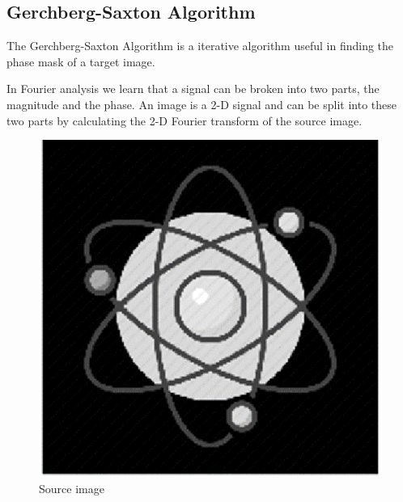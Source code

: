\documentclass{article}
\begin{document}
\pagebreak
\subsection{Gerchberg-Saxton Algorithm}
The Gerchberg-Saxton Algorithm is a iterative algorithm useful in finding the phase mask of a target image.

In Fourier analysis we learn that a signal can be broken into two parts, the magnitude and the phase. An image is a 2-D signal and can be split into these two parts by calculating the 2-D Fourier transform of the source image.

\begin{figure}[!phbt]
\centering
	\begin{minipage}{.3\linewidth}
		\centering
    	\includegraphics[width= \linewidth]{img/sourceimage.eps}
    	\caption{Source image}
    	\label{fig:sourceimage}
    \end{minipage}
    \begin{minipage}{.3\linewidth}
    	\centering

\end{minipage}
\end{figure}
\end{document}
